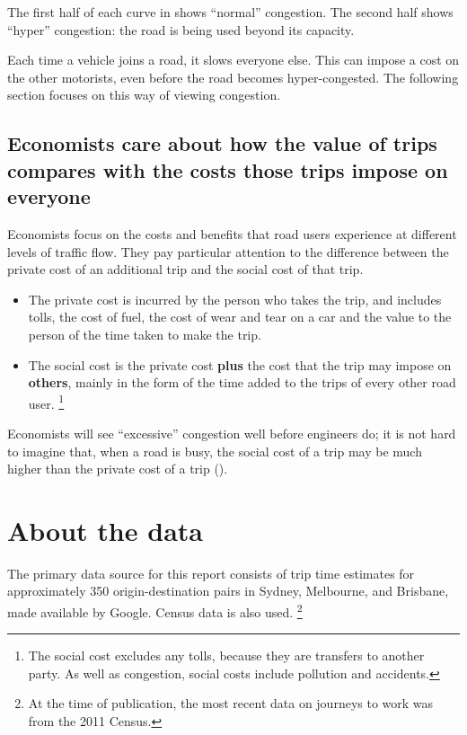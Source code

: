 \documentclass{grattan}
\begin{document}
The first half of each curve in  shows “normal” congestion.
The second half shows ``hyper'' congestion: the road is being used beyond its capacity.

Each time a vehicle joins a road, it slows everyone else.
This can impose a cost on the other motorists, even before the road becomes hyper-congested.
The following section focuses on this way of viewing congestion.


\section{Economists care about how the value of trips compares with the costs those trips impose on everyone} \label{subsec:Economists-perspective}

Economists focus on the costs and benefits that road users experience at different levels of traffic flow.
They pay particular attention to the difference between the private cost of an additional trip and the social cost of that trip.

\begin{itemize}
\item The private cost is incurred by the person who takes the trip, and includes tolls, the cost of fuel, the cost of wear and tear on a car and the value to the person of the time taken to make the trip.
\item The social cost is the private cost \textbf{plus} the cost that the trip may impose on \textbf{others}, mainly in the form of the time added to the trips of every other road user.%
\footnote{The social cost excludes any tolls, because they are transfers to another party.
As well as congestion, social costs include pollution and accidents.}
\end{itemize}

Economists will see ``excessive'' congestion well before engineers do; it is not hard to imagine that, when a road is busy, the social cost of a trip may be much higher than the private cost of a trip ().

\label{para:three-perspectives-on-congestion--end}



\chapter{About the data}\label{chap:appendix-notes-on-sample}
The primary data source for this report consists of trip time estimates for approximately 350 origin-destination pairs in Sydney, Melbourne, and Brisbane, made available by Google. Census data is also used.%
\footnote{At the time of publication, the most recent data on journeys to work was from the 2011 Census.}
\end{document}
